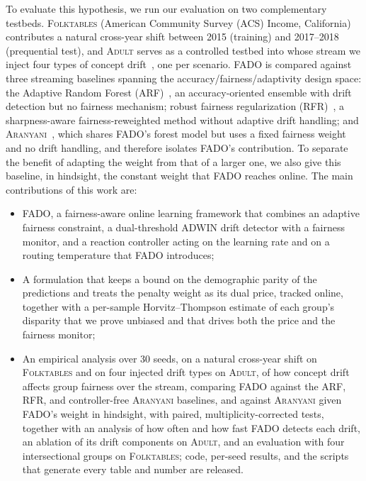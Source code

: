 \documentclass[conference]{IEEEtran}
\newcommand{\fado}{\textsc{FADO}}
\newcommand{\ara}{\textsc{Aranyani}}
\newcommand{\arf}{\textsc{ARF}}
\newcommand{\rfr}{\textsc{RFR}}
\newcommand{\adult}{\textsc{Adult}}
\newcommand{\folk}{\textsc{Folktables}}
\newcommand{\rev}[1]{{\color{blue}#1}}
\renewcommand{\rev}[1]{#1}
\begin{document}
To evaluate this hypothesis, we run our evaluation on two complementary testbeds. \folk{} (American Community Survey (ACS) Income,
California) contributes a natural cross-year shift between 2015 (training) and 2017--2018 (prequential test), and \adult{} serves as a controlled testbed into
whose stream we inject four types of concept drift~\cite{10.1145/3770855.3819070}, one per scenario. \fado{} is compared against three streaming baselines
spanning the accuracy/fairness/adaptivity design space: the Adaptive Random Forest (\arf{})~\cite{10.1007/s10994-017-5642-8}, an accuracy-oriented ensemble with
drift detection but no fairness mechanism; robust fairness regularization (\rfr{})~\cite{jiang2023chasingfairnessdistributionshift}, a sharpness-aware
fairness-reweighted method without adaptive drift handling; and \ara{}~\cite{chowdhury2024enhancing}, which shares \fado{}'s forest model but uses a fixed
fairness weight and no drift handling, and therefore isolates \fado{}'s contribution. To separate the benefit of adapting the weight from that of a larger one, we
also give this baseline, in hindsight, the constant weight that \fado{} reaches online. The main contributions of this work are:
\begin{itemize}
\item \fado{}, a fairness-aware online learning framework that combines an adaptive fairness constraint, a dual-threshold ADWIN drift detector with a
fairness monitor, and a reaction controller acting on the learning rate and on a routing temperature that \fado{} introduces;
\item A formulation that keeps a bound on the demographic parity
of the predictions and treats the penalty weight as its dual price, tracked online, together with a per-sample Horvitz--Thompson estimate of each group's disparity that we prove unbiased and that drives both the price and the fairness monitor;
\item An empirical analysis over 30 seeds, on a natural cross-year shift on \folk{} and on four injected drift types on \adult{}, of how concept drift affects group
fairness over the stream, comparing \fado{} against the \arf{}, \rfr{}, and controller-free \ara{} baselines, and against \ara{} given \fado{}'s weight in
hindsight, with paired, multiplicity-corrected tests, together with an analysis of how often and how fast \fado{} detects each drift\rev{, an ablation of its drift components
on \adult{}, and an evaluation with four intersectional groups on \folk{}}; code, per-seed results,
and the scripts that generate every table and number are released.
\end{itemize}
\end{document}
